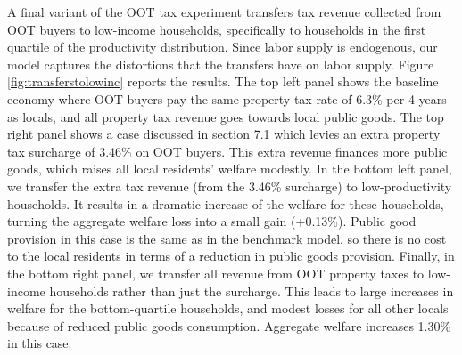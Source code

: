 \documentclass[letterpaper,12pt,dvipsnames,usenames]{article}
\theoremstyle{definition}
\begin{document}
\begin{spacing}{1.25}
{A final variant of the OOT tax experiment transfers tax revenue collected from OOT buyers to low-income households, specifically to households in the first quartile of the productivity distribution. Since labor supply is endogenous, our model captures the distortions that the transfers have on labor supply. Figure \ref{fig:transferstolowinc} reports the results. The top left panel shows the baseline economy where OOT buyers pay the same property tax rate of 6.3\% per 4 years as locals, and all property tax revenue goes towards local public goods. The top right panel shows a case discussed in section 7.1 which levies an extra property tax surcharge of 3.46\% on OOT buyers. This extra revenue finances more public goods, which raises all local residents' welfare modestly. In the bottom left panel, we transfer the extra tax revenue (from the 3.46\% surcharge) to low-productivity households. It results in a dramatic increase of the welfare for these households, turning the aggregate welfare loss into a small gain (+0.13\%). Public good provision in this case is the same as in the benchmark model, so there is no cost to the local residents in terms of a reduction in public goods provision. Finally, in the bottom right panel, we transfer all revenue from OOT property taxes to low-income households rather than just the surcharge. This leads to large increases in welfare for the bottom-quartile households, and modest losses for all other locals because of reduced public goods consumption. Aggregate welfare increases 1.30\% in this case.

}
\end{spacing}
\end{document}
